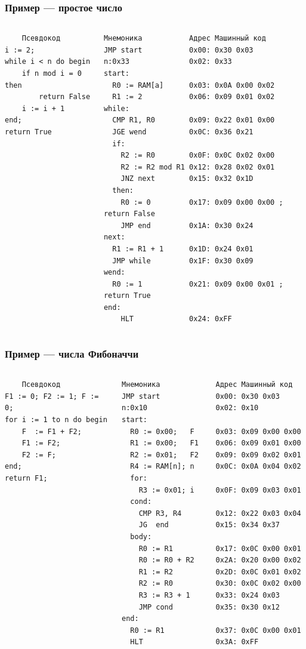 \documentclass{beamer}
\begin{document}
    \begin{frame}[fragile]
    \frametitle{Пример --- простое число}
    \scriptsize
    \begin{columns}
    \begin{verbatim}
    Псевдокод
i := 2;
while i < n do begin
    if n mod i = 0 then 
        return False
    i := i + 1
end;
return True
    \end{verbatim}
    \begin{verbatim}
Мнемоника           Адрес Машинный код
JMP start           0x00: 0x30 0x03
n:0x33              0x02: 0x33
start:
  R0 := RAM[a]      0x03: 0x0A 0x00 0x02
  R1 := 2           0x06: 0x09 0x01 0x02
while:
  CMP R1, R0        0x09: 0x22 0x01 0x00  
  JGE wend          0x0C: 0x36 0x21
  if:
    R2 := R0        0x0F: 0x0C 0x02 0x00
    R2 := R2 mod R1 0x12: 0x28 0x02 0x01
    JNZ next        0x15: 0x32 0x1D
  then:
    R0 := 0         0x17: 0x09 0x00 0x00 ; return False
    JMP end         0x1A: 0x30 0x24
next:
  R1 := R1 + 1      0x1D: 0x24 0x01
  JMP while         0x1F: 0x30 0x09
wend:
  R0 := 1           0x21: 0x09 0x00 0x01 ; return True  
end:
    HLT             0x24: 0xFF
    \end{verbatim}
    \end{columns}
\end{frame}
    \begin{frame}[fragile]
    \frametitle{Пример --- числа Фибоначчи}
    \scriptsize
    \begin{columns}
    \begin{verbatim}
    Псевдокод
F1 := 0; F2 := 1; F := 0;
for i := 1 to n do begin
    F  := F1 + F2;
    F1 := F2;
    F2 := F;
end;
return F1;
    \end{verbatim}
    \begin{verbatim}
Мнемоника             Адрес Машинный код
JMP start             0x00: 0x30 0x03
n:0x10                0x02: 0x10
start:
  R0 := 0x00;   F     0x03: 0x09 0x00 0x00
  R1 := 0x00;   F1    0x06: 0x09 0x01 0x00
  R2 := 0x01;   F2    0x09: 0x09 0x02 0x01
  R4 := RAM[n]; n     0x0C: 0x0A 0x04 0x02
  for:
    R3 := 0x01; i     0x0F: 0x09 0x03 0x01
  cond:   
    CMP R3, R4        0x12: 0x22 0x03 0x04  
    JG  end           0x15: 0x34 0x37
  body:
    R0 := R1          0x17: 0x0C 0x00 0x01
    R0 := R0 + R2     0x2A: 0x20 0x00 0x02
    R1 := R2          0x2D: 0x0C 0x01 0x02
    R2 := R0          0x30: 0x0C 0x02 0x00
    R3 := R3 + 1      0x33: 0x24 0x03
    JMP cond          0x35: 0x30 0x12
end:
  R0 := R1            0x37: 0x0C 0x00 0x01
  HLT                 0x3A: 0xFF
    \end{verbatim}
    \end{columns}
\end{frame}
\end{document}
